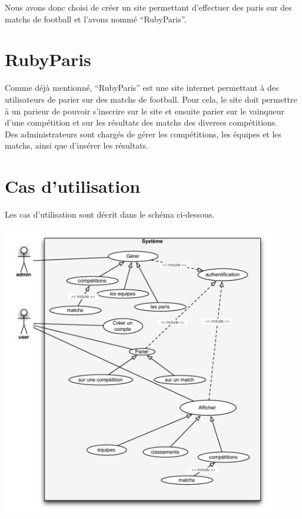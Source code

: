 \documentclass[10pt,a4paper,titlepage]{article}
\begin{document}
Nous avons donc choisi de créer un site permettant d'effectuer des paris sur des matchs de football et l'avons nommé “RubyParis”.

\section{RubyParis}

Comme déjà mentionné, “RubyParis” est une site internet permettant à des utilisateurs de parier sur des matchs de football. Pour cela, le site doit permettre à un parieur de pouvoir s'inscrire sur le site et ensuite parier sur le vainqueur d'une compétition et sur les résultats des matchs des diverses compétitions. \\

Des administrateurs sont chargés de gérer les compétitions, les équipes et les matchs, ainsi que d'insérer les résultats.

\section{Cas d'utilisation}\label{casUtilisation}

Les cas d'utilisation sont décrit dans le schéma ci-dessous.

\includegraphics[width=12cm]{imgs/cas_utilisation-notitle.pdf}
\end{document}
